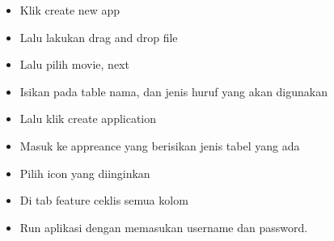 \begin{enumerate}
	\begin{itemize}
	\item Klik create new app
	\end{itemize}
	
	\begin{itemize}
	\item Lalu lakukan drag and drop file
	\end{itemize}
	 
	\begin{itemize}
	\item Lalu pilih movie, next
	\end{itemize}
	 
	\begin{itemize}
	\item Isikan pada table nama, dan jenis huruf yang akan digunakan
	\end{itemize}
	 
	\begin{itemize}
	\item Lalu klik create application
	\end{itemize}
	 
	\begin{itemize}
	\item Masuk ke appreance yang berisikan jenis tabel yang ada
	\end{itemize}
	
	\begin{itemize}
	\item Pilih icon yang diinginkan
	\end{itemize}
	 
	\begin{itemize}
	\item Di tab feature ceklis semua kolom
	\end{itemize}
	 
	\begin{itemize} 
	\item Run aplikasi dengan memasukan username dan password.
	\end{itemize}

	
	
	
	
\end{enumerate}
